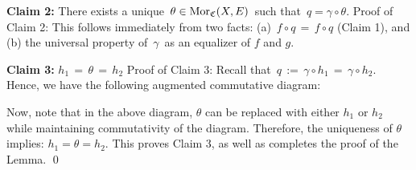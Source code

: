 \vskip 0.3cm
\noindent
\textbf{Claim 2:}\;\; There exists a unique \,$\theta \in \textnormal{Mor}_{\mathfrak{C}}(X,E)$\, such that \,$q = \gamma \circ \theta$.
\vskip 0.1cm
\noindent
Proof of Claim 2:\;
This follows immediately from two facts:
(a)	\,$f \circ q \,=\, f \circ q$ (Claim 1), and
(b)	the universal property of \,$\gamma$\, as an equalizer of $f$ and $g$.
\begin{center}
\end{center}

\vskip 0.3cm
\noindent
\textbf{Claim 3:}\;\;  $h_{1} \,=\, \theta \,=\, h_{2}$
\vskip 0.1cm
\noindent
Proof of Claim 3:\;
Recall that \,$q \,:=\, \gamma \circ h_{1} \,=\, \gamma \circ h_{2}$.\,
Hence, we have the following augmented commutative diagram:
\begin{center}
\end{center}
Now, note that in the above diagram,
$\theta$ can be replaced with either $h_{1}$ or $h_{2}$ while maintaining commutativity of the diagram.
Therefore, the uniqueness of $\theta$ implies: $h_{1} = \theta = h_{2}$.
This proves Claim 3, as well as completes the proof of the Lemma.
\qed


